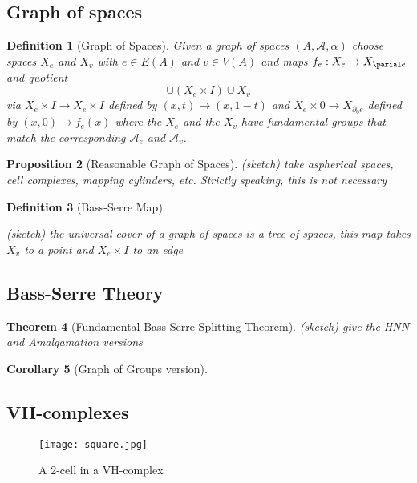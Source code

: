 \documentclass{article}
\theoremstyle{mystyle}
\newtheorem{thm}{Theorem}[section]
\newtheorem{pro}[thm]{Proposition}
\newtheorem{defn}[thm]{Definition}
\newtheorem{cor}[thm]{Corollary}
\theoremstyle{remark}
\begin{document}
\subsection{Graph of spaces}
\begin{defn}
    [Graph of Spaces]
    Given a graph of spaces $(A,\mathscr A, \alpha)$ choose spaces $X_e$ and $X_v$ with $e\in E(A)$ and $v\in V(A)$ and maps $f_e: X_e\to X_{\parial e}$ and quotient \[ \cup (X_e \times I) \cup X_v \] via  \(X_e \times I \to X_{\bar{e}} \times I\) defined by \((x,t)\to(x,1-t)\) and \(X_e\times 0\to X_{\partial_0 e}\) defined by \( (x,0)\to f_e(x)\) where the $X_e$ and the $X_v$ have fundamental groups that match the corresponding $\mathscr A_e$ and $\mathscr A_v$.
\end{defn}

\begin{pro}
    [Reasonable Graph of Spaces]
    (sketch) take aspherical spaces, cell complexes, mapping cylinders, etc. Strictly speaking, this is not necessary 
\end{pro}
    
\begin{defn}
    [Bass-Serre Map]
    \label{defn:bsmap}
    
    (sketch)
    the universal cover of a graph of spaces is a tree of spaces, this map takes $X_v$ to a point and $X_e \times I$ to an edge
\end{defn}
\subsection{Bass-Serre Theory}

\begin{thm}
[Fundamental Bass-Serre Splitting Theorem]
(sketch) give the HNN and Amalgamation versions
\end{thm}

\begin{cor}
[Graph of Groups version]
\end{cor}


\subsection{VH-complexes}

\begin{figure}[htp]
    \centering
    \texttt{[image: square.jpg]}
    \caption{A 2-cell in a VH-complex}
    \label{fig:square}
\end{figure}
 
\end{document}
